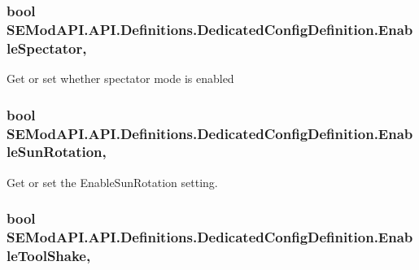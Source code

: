 \subsubsection[{Enable\+Spectator}]{\setlength{\rightskip}{0pt plus 5cm}bool S\+E\+Mod\+A\+P\+I.\+A\+P\+I.\+Definitions.\+Dedicated\+Config\+Definition.\+Enable\+Spectator\hspace{0.3cm}{\ttfamily [get]}, {\ttfamily [set]}}\label{class_s_e_mod_a_p_i_1_1_a_p_i_1_1_definitions_1_1_dedicated_config_definition_a366f63f94887962c7ca95fbce5e68593}


Get or set whether spectator mode is enabled 

\hypertarget{class_s_e_mod_a_p_i_1_1_a_p_i_1_1_definitions_1_1_dedicated_config_definition_a4510fc12c4dfab63cc8890034b0cfe58}{}
\subsubsection[{Enable\+Sun\+Rotation}]{\setlength{\rightskip}{0pt plus 5cm}bool S\+E\+Mod\+A\+P\+I.\+A\+P\+I.\+Definitions.\+Dedicated\+Config\+Definition.\+Enable\+Sun\+Rotation\hspace{0.3cm}{\ttfamily [get]}, {\ttfamily [set]}}\label{class_s_e_mod_a_p_i_1_1_a_p_i_1_1_definitions_1_1_dedicated_config_definition_a4510fc12c4dfab63cc8890034b0cfe58}


Get or set the Enable\+Sun\+Rotation setting. 

\hypertarget{class_s_e_mod_a_p_i_1_1_a_p_i_1_1_definitions_1_1_dedicated_config_definition_a28da55c57e0e883185b1cddce38f8990}{}
\subsubsection[{Enable\+Tool\+Shake}]{\setlength{\rightskip}{0pt plus 5cm}bool S\+E\+Mod\+A\+P\+I.\+A\+P\+I.\+Definitions.\+Dedicated\+Config\+Definition.\+Enable\+Tool\+Shake\hspace{0.3cm}{\ttfamily [get]}, {\ttfamily [set]}}\label{class_s_e_mod_a_p_i_1_1_a_p_i_1_1_definitions_1_1_dedicated_config_definition_a28da55c57e0e883185b1cddce38f8990}


